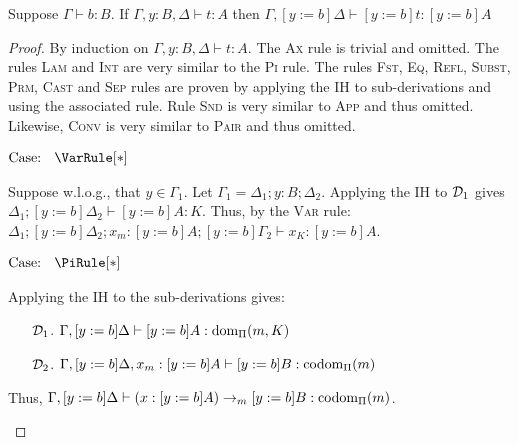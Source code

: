 \begin{lemma}[Substitution]
    \label{lem:2:subst}
    Suppose $\Gamma \vdash b : B$.
    If $\Gamma, y : B, \Delta \vdash t : A$ then $\Gamma, [y := b]\Delta \vdash [y := b]t : [y := b]A$
\end{lemma}
\begin{proof}
    By induction on $\Gamma, y : B, \Delta \vdash t : A$.
    The \textsc{Ax} rule is trivial and omitted.
    The rules \textsc{Lam} and \textsc{Int} are very similar to the \textsc{Pi} rule.
    The rules \textsc{Fst}, \textsc{Eq}, \textsc{Refl}, \textsc{Subst}, \textsc{Prm}, \textsc{Cast} and \textsc{Sep} rules are proven by applying the IH to sub-derivations and using the associated rule.
    Rule \textsc{Snd} is very similar to \textsc{App} and thus omitted.
    Likewise, \textsc{Conv} is very similar to \textsc{Pair} and thus omitted.

    $\text{Case: }\begin{array}{c} \VarRule[*] \end{array}$
    \begin{proofcase}
        Suppose w.l.o.g., that $y \in \Gamma_1$.
        Let $\Gamma_1 = \Delta_1; y : B; \Delta_2$.
        Applying the IH to $\mathcal{D}_{1}$ gives $\Delta_1; [y := b]\Delta_2 \vdash [y := b]A : K$.
        Thus, by the \textsc{Var} rule: $\Delta_1; [y := b]\Delta_2; x_m : [y := b]A; [y := b]\Gamma_2 \vdash x_K : [y := b]A$.
    \end{proofcase}

    $\text{Case: }\begin{array}{c} \PiRule[*] \end{array}$
    \begin{proofcase}
        Applying the IH to the sub-derivations gives:
        \begin{enumerate}
            \item[$\mathcal{D}_{1}$.] $\Gamma, [y := b]\Delta \vdash [y := b]A : \textnormal{dom}_\Pi(m, K)$
            \item[$\mathcal{D}_{2}$.] $\Gamma, [y := b]\Delta, x_m : [y := b]A \vdash [y := b]B : \textnormal{codom}_\Pi(m)$
        \end{enumerate}
        Thus, $\Gamma, [y := b]\Delta \vdash (x : [y := b]A) \to_m [y := b]B : \textnormal{codom}_\Pi(m)$.
    \end{proofcase}


\end{proof}
